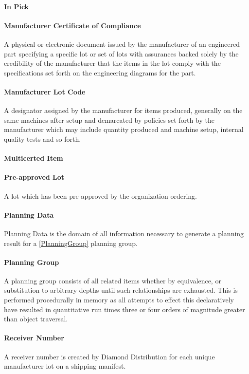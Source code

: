 \paragraph{In Pick}
\paragraph{Manufacturer Certificate of Compliance}
A physical or electronic document issued by the manufacturer of an engineered part specifying a specific 
lot or set of lots with assurances backed solely by the credibility of the manufacturer that the items in
the lot comply with the specifications set forth on the engineering diagrams for the part.
\paragraph{Manufacturer Lot Code}
A designator assigned by the manufacturer for items produced, generally on the same machines after setup and
demarcated by policies set forth by the manufacturer which may include quantity produced and machine setup,
internal quality tests and so forth.
\paragraph{Multicerted Item}


\paragraph{Pre-approved Lot}  
A lot which has been pre-approved by the organization ordering.
\paragraph{Planning Data}
Planning Data is the domain of all information necessary to generate a planning result for a \ref{PlanningGroup} planning group.
\label{PlanningGroup} 
\paragraph{Planning Group}
A planning group consists of all related items whether by equivalence, or substitution to arbitrary
depths until such relationships are exhausted.  This is performed procedurally in memory as all attempts
to effect this declaratively have resulted in quantitative run times three or four orders of magnitude greater
than object traversal.

\paragraph{Receiver Number}
A receiver number is created by Diamond Distribution for each unique manufacturer lot on a shipping manifest.

